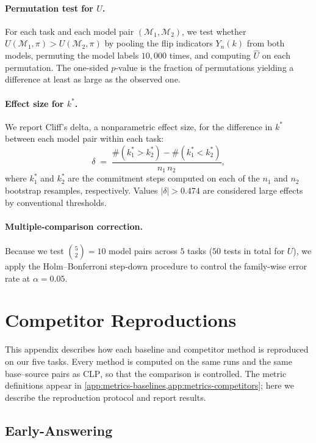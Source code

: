 \documentclass[11pt]{article}
\newcommand{\stepk}{k}
\newcommand{\CLP}{\textsc{CLP}}
\begin{document}
\paragraph{Permutation test for $U$.}
For each task and each model pair $(\mathcal{M}_1,\mathcal{M}_2)$, we test
whether $U(\mathcal{M}_1,\pi) > U(\mathcal{M}_2,\pi)$ by pooling the flip
indicators $Y_n(\stepk)$ from both models, permuting the model labels $10{,}000$
times, and computing $\widehat{U}$ on each permutation. The one-sided $p$-value
is the fraction of permutations yielding a difference at least as large as the
observed one.

\paragraph{Effect size for $\stepk^{*}$.}
We report Cliff's delta, a nonparametric effect size, for the difference in
$\stepk^{*}$ between each model pair within each task:
\begin{equation}
\label{eq:cliffs-delta}
\delta \;=\; \frac{\#(k^{*}_1 > k^{*}_2) - \#(k^{*}_1 < k^{*}_2)}{n_1\,n_2},
\end{equation}
where $k^{*}_1$ and $k^{*}_2$ are the commitment steps computed on each of the
$n_1$ and $n_2$ bootstrap resamples, respectively. Values $|\delta|>0.474$ are
considered large effects by conventional thresholds.

\paragraph{Multiple-comparison correction.}
Because we test $\binom{5}{2}=10$ model pairs across $5$ tasks ($50$ tests in
total for $U$), we apply the Holm--Bonferroni step-down procedure to control the
family-wise error rate at $\alpha=0.05$.

\section{Competitor Reproductions}
\label{app:competitors}

This appendix describes how each baseline and competitor method is reproduced on
our five tasks. Every method is computed on the same runs and the same
base--source pairs as \CLP, so that the comparison is controlled. The metric
definitions appear in \cref{app:metrics-baselines,app:metrics-competitors};
here we describe the reproduction protocol and report results.

\subsection{Early-Answering}
\label{app:competitors-ea}
\end{document}
